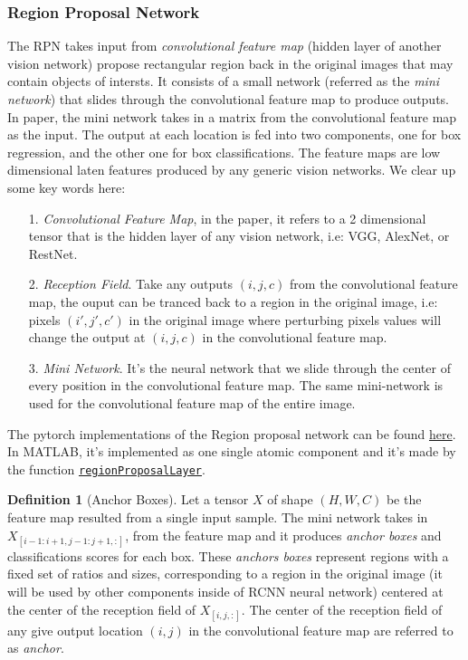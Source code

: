 \documentclass[]{article}
\theoremstyle{definition}
\newtheorem{definition}{Definition}
\numberwithin{equation}{subsection}
\newcommand{\inlinecode}[1]{\texttt{\footnotesize #1}}
\begin{document}
        \subsubsection{Region Proposal Network}
            The RPN takes input from \textit{convolutional feature map} (hidden layer of another vision network) propose rectangular region back in the original images that may contain objects of intersts. 
            It consists of a small network (referred as the \textit{mini network}) that slides through the convolutional feature map to produce outputs. 
            In paper, the mini network takes in a matrix from the convolutional feature map as the input. 
            The output at each location is fed into two components, one for box regression, and the other one for box classifications. 
            The feature maps are low dimensional laten features produced by any generic vision networks.
            We clear up some key words here: 
            \begin{enumerate}
                \item [1.] \textit{Convolutional Feature Map}, in the paper, it refers to a 2 dimensional tensor that is the hidden layer of any vision network, i.e: VGG, AlexNet, or RestNet. 
                \item [2.] \textit{Reception Field}. Take any outputs $(i, j, c)$ from the convolutional feature map, the ouput can be tranced back to a region in the original image, i.e: pixels $(i', j', c')$ in the original image where perturbing pixels values will change the output at $(i, j, c)$ in the convolutional feature map. 
                \item [3.] \textit{Mini Network}. It's the neural network that we slide through the center of every position in the convolutional feature map. 
                The same mini-network is used for the convolutional feature map of the entire image. 
            \end{enumerate}
            \par
            The pytorch implementations of the Region proposal network can be found \href{https://github.com/pytorch/vision/blob/5181a854d8b127cf465cd22a67c1b5aaf6ccae05/torchvision/models/detection/rpn.py}{here}. 
            In MATLAB, it's implemented as one single atomic component and it's made by the function \href{https://www.mathworks.com/help/vision/ref/nnet.cnn.layer.regionproposallayer.html}{\inlinecode{regionProposalLayer}}. 
            \begin{definition}[Anchor Boxes]
                Let a tensor $X$ of shape $(H, W, C)$ be the feature map resulted from a single input sample.
                The mini network takes in $X_{[i-1:i+1, j-1:j+1, :]}$, from the feature map and it produces \textit{anchor boxes} and classifications scores for each box. 
                These \textit{anchors boxes} represent regions with a fixed set of ratios and sizes, corresponding to a region in the original image (it will be used by other components inside of RCNN neural network) centered at the center of the reception field of $X_{[i, j, :]}$. 
                The center of the reception field of any give output location $(i, j)$ in the convolutional feature map are referred to as \textit{anchor}. 
            \end{definition}
\end{document}
